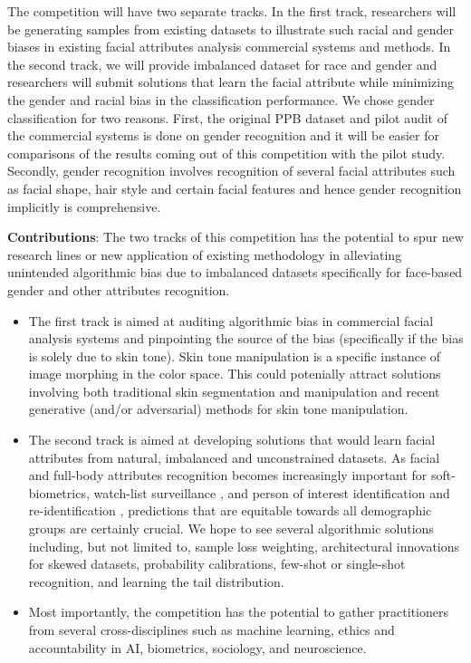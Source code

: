 \documentclass[11pt, oneside]{article}
\makeatletter
\let\@internalcite\cite
\def\cite{\def\citeauthoryear##1##2{##1, ##2}\@internalcite}
\makeatother
\begin{document}
The competition will have two separate tracks. In the first track, researchers
will be generating samples from existing datasets to illustrate such racial and
gender biases in existing facial attributes analysis commercial systems and
methods. In the second track, we will provide imbalanced dataset for race and
gender and researchers will submit solutions that learn the facial attribute
while minimizing the gender and racial bias in the classification performance.
We chose gender classification for two reasons. First, the original PPB dataset
and pilot audit of the commercial systems is done on gender recognition and it
will be easier for comparisons of the results coming out of this competition
with the pilot study. Secondly, gender recognition involves recognition of
several facial attributes such as facial shape, hair style and certain facial
features and hence gender recognition implicitly is comprehensive.

{\bf Contributions}: The two tracks of this competition has the potential to 
spur new research lines or new application of existing methodology in 
alleviating unintended algorithmic bias due to imbalanced datasets specifically 
for face-based gender and other attributes recognition. 
\begin{itemize}
	\item The first track is aimed at auditing algorithmic bias in commercial 
	facial analysis systems and pinpointing the source of the bias 
	(specifically if the bias is solely due to skin tone). Skin tone 
	manipulation is a specific instance of image morphing in the color space. 
	This could potenially attract solutions involving both traditional skin 
	segmentation and manipulation \cite{martinson2013identifying} and recent 
	generative (and/or adversarial) 
	methods for skin tone manipulation.
	\item The second track is aimed at developing solutions that would learn 
	facial attributes from natural, imbalanced and unconstrained datasets. As 
	facial and full-body attributes recognition \cite{bekele2017multi} becomes 
	increasingly important
	for soft-biometrics, watch-list surveillance  \cite{kamgar2011toward}, and
	person of interest identification and re-identification 
	\cite{best2014unconstrained}, predictions that are equitable towards all 
	demographic groups are certainly crucial. We hope to see several 
	algorithmic solutions including, but not limited to, sample loss weighting, 
	architectural innovations for skewed datasets, probability calibrations, 
	few-shot or single-shot recognition, and learning the tail distribution.
	\item Most importantly, the competition has the potential to gather 
	practitioners from several cross-disciplines such as machine learning, 
	ethics and accountability in AI, biometrics, sociology, and neuroscience.
\end{itemize}
\end{document}
